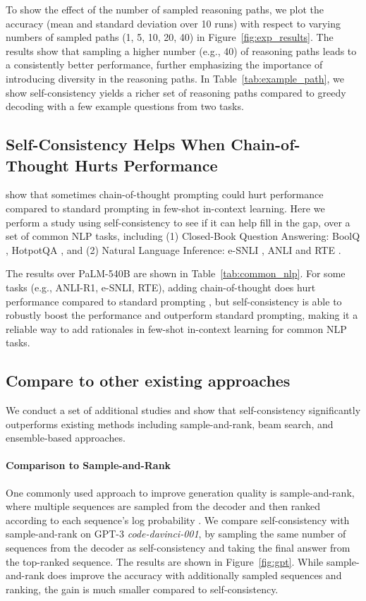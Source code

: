 To show the effect of the number of sampled reasoning paths, we plot the accuracy (mean and standard deviation over 10 runs) with respect to varying numbers of sampled paths (1, 5, 10, 20, 40) in Figure~\ref{fig:exp_results}.
The results show that sampling a higher number (e.g., 40) of reasoning paths leads to a consistently better performance, further emphasizing the importance of introducing diversity in the reasoning paths. In Table~\ref{tab:example_path}, we show self-consistency yields a richer set of reasoning paths compared to greedy decoding with a few example questions from two tasks. 

\subsection{Self-Consistency Helps When Chain-of-Thought Hurts Performance}
\citet{ye2022unreliability} show that sometimes chain-of-thought prompting could hurt performance compared to standard prompting in few-shot in-context learning. Here we perform a study using self-consistency to see if it can help fill in the gap, over a set of common NLP tasks, including (1) Closed-Book Question Answering: BoolQ \citep{clark2019boolq}, HotpotQA \citep{yang-etal-2018-hotpotqa}, and (2) Natural Language Inference: e-SNLI \citep{esnli}, ANLI \citep{nie-etal-2020-adversarial} and RTE \citep{dagan2005pascal,bar2006second,giampiccolo2007third,bentivogli2009fifth}.

The results over PaLM-540B are shown in Table~\ref{tab:common_nlp}. 
For some tasks (e.g., ANLI-R1, e-SNLI, RTE), adding chain-of-thought does hurt performance compared to standard prompting \citep{brown2020language}, but self-consistency is able to robustly boost the performance and outperform standard prompting, making it a reliable way to add rationales in few-shot in-context learning for common NLP tasks.

\subsection{Compare to other existing approaches}
\label{sec:ablation_compare}

We conduct a set of additional studies and show that self-consistency significantly outperforms existing methods including sample-and-rank, beam search, and ensemble-based approaches.

\paragraph{Comparison to Sample-and-Rank} One commonly used approach to improve generation quality is sample-and-rank, where multiple sequences are sampled from the decoder and then ranked according to each sequence's log probability \citep{adiwardana2020humanlike}. We compare self-consistency with sample-and-rank on GPT-3 \textit{code-davinci-001}, by sampling the same number of sequences from the decoder as self-consistency and taking the final answer from the top-ranked sequence. The results are shown in Figure~\ref{fig:gpt}.
While sample-and-rank does improve the accuracy with additionally sampled sequences and ranking, the gain is much smaller compared to self-consistency.

